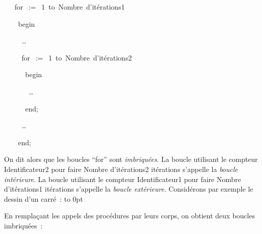 \mbox{\blc\ \ \ {\mcl for}\hspace{0.3em}\blanc\hspace{0.3em}{\small\rm Identificateur1}\ $:=$\ 1\hspace{0.3em}\blanc\hspace{0.3em}
{\mcl to}\hspace{0.3em}\blanc\hspace{0.3em} {\small\rm Nombre d'itérations1} \hspace{0.3em}\blanc\hspace{0.3em}{\mcl do}}\par 
\mbox{\blc\ \ \ \ \mcl begin}\par 
\mbox{\blc\ \ \ \ \ \small\rm  \ldots}\par 
\mbox{\blc\ \ \ \ \ {\mcl for}\hspace{0.3em}\blanc\hspace{0.3em}{\small\rm Identificateur2}\ $:=$\ 1\hspace{0.3em}\blanc\hspace{0.3em}
{\mcl to}\hspace{0.3em}\blanc\hspace{0.3em} {\small\rm Nombre d'itérations2} \hspace{0.3em}\blanc\hspace{0.3em}{\mcl do}}\par 
\mbox{\blc\ \ \ \ \ \ \mcl begin}\par 
\mbox{\blc\ \ \ \ \ \ \ \small\rm  \ldots}\par 
\mbox{\blc\ \ \ \ \ \ {\mcl end}\idt$;$}\par 
\mbox{\blc\ \ \ \ \ \small\rm  \ldots}\par 
\mbox{\blc\ \ \ \ {\mcl end}\idt$;$}\par 

\noindent On dit alors que les  boucles ``for'' sont {\em imbriquées}. 
La boucle utilisant le 
compteur {\small\rm Identificateur2} pour faire 
{\small\rm Nombre d'itérations2} itérations s'appelle la
 {\em boucle intérieure}. La boucle utilisant le compteur {\small\rm Identificateur1} pour faire 
{\small\rm Nombre d'itérations1} itérations s'appelle la {\em boucle extérieure}. Considérons par exemple
le dessin d'un carré~:
\newpage
\vbox to 0pt{}%


En remplaçant les appels des procédures par leurs corps, on obtient
deux boucles imbriquées~:



